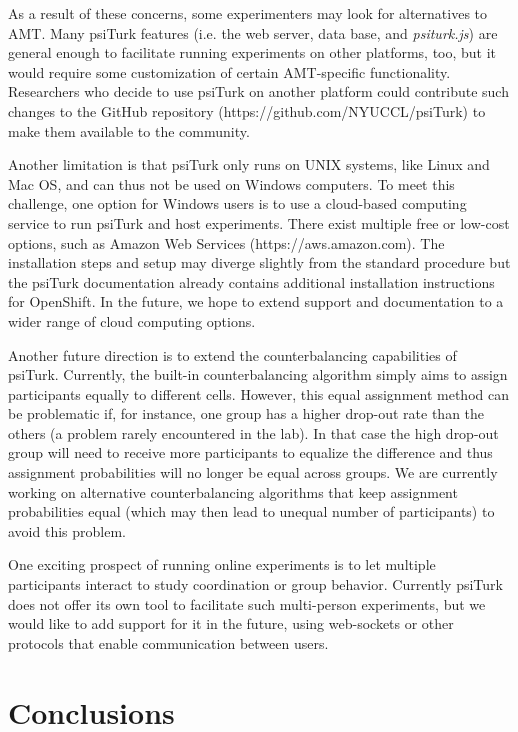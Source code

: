 \documentclass[twocolumn]{svjour3}          %
\newcommand{\psiturk}[0]{\textsf{psiTurk}}
\newcommand{\psiturkjs}[0]{\emph{psiturk.js}}
\begin{document}
As a result of these concerns, some experimenters may look for alternatives to AMT. 
Many \psiturk{} features (i.e. the web server, data base, and \psiturkjs{}) are general enough to facilitate running experiments 
on other platforms, too, but it would require some customization of certain AMT-specific functionality. 
Researchers who decide to use \psiturk{} on another platform could contribute such changes to the GitHub repository 
(\textsf{https://github.com/NYUCCL/psiTurk}) to make them available to the community.

Another limitation is that \psiturk{} only runs on UNIX systems, like Linux and Mac OS, and can thus not be used on Windows computers. To meet this 
challenge, one option for Windows users is to use a cloud-based computing service to run \psiturk{} and host experiments. There exist
multiple free or low-cost options, such as Amazon Web Services (\textsf{https://aws.amazon.com}). 
The installation steps and setup may diverge slightly from the standard procedure but  the \psiturk{} documentation already contains 
additional installation instructions for OpenShift. In the future, we hope to extend support  and documentation to a wider range of cloud 
computing options.

Another future direction is to extend the counterbalancing capabilities of \psiturk{}. Currently, the built-in counterbalancing algorithm
simply aims to assign participants equally to different cells.  However, this equal assignment method can be problematic if, for instance, 
one group has a higher drop-out rate than the others (a problem rarely encountered in the lab). 
In that case the high drop-out group will need to receive
more participants to equalize the difference and thus assignment probabilities will no longer be equal across groups. We are
currently working on alternative counterbalancing algorithms that keep assignment probabilities equal (which may then lead to unequal
number of participants) to avoid this problem. 

One exciting prospect of running online experiments is to let multiple participants interact to study coordination
or group behavior. Currently \psiturk{} does not offer its own tool to facilitate such multi-person experiments, but we would like to
add support for it in the future, using web-sockets or other protocols that enable communication between users.

\section{Conclusions}
\end{document}
